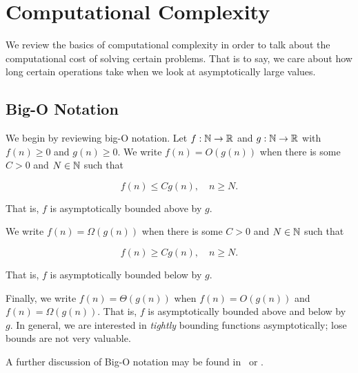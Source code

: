 \section{Computational Complexity}

We review the basics of computational complexity in order
to talk about the computational cost of solving certain problems.
That is to say, we care about how long certain operations
take when we look at asymptotically large values.

\subsection{Big-O Notation}

We begin by reviewing big-O notation.
Let $f:\mathbb{N}\to\mathbb{R}$ and $g:\mathbb{N}\to\mathbb{R}$ with $f(n)\ge0$ and $g(n)\ge0$.
We write $f(n) = O(g(n))$ when there is some $C>0$
and $N\in\mathbb{N}$ such that

\begin{equation}
    f(n) \le Cg(n), \quad n\ge N.
\end{equation}

\noindent
That is, $f$ is asymptotically bounded above by $g$.

We write $f(n) = \Omega(g(n))$ when there is some $C>0$
and $N\in\mathbb{N}$ such that

\begin{equation}
    f(n) \ge Cg(n), \quad n\ge N.
\end{equation}

\noindent
That is, $f$ is asymptotically bounded below by $g$.

Finally, we write $f(n) = \Theta(g(n))$ when $f(n) = O(g(n))$ and
$f(n) = \Omega(g(n))$.
That is, $f$ is asymptotically bounded above and below by $g$.
In general, we are interested in \emph{tightly} bounding functions
asymptotically; lose bounds are not very valuable.

A further discussion of Big-O notation may be found
in~\cite[Chapter 3]{IntroToAlgs} or
\cite[Chapter 1.2.11.1]{TAOCP1}.

